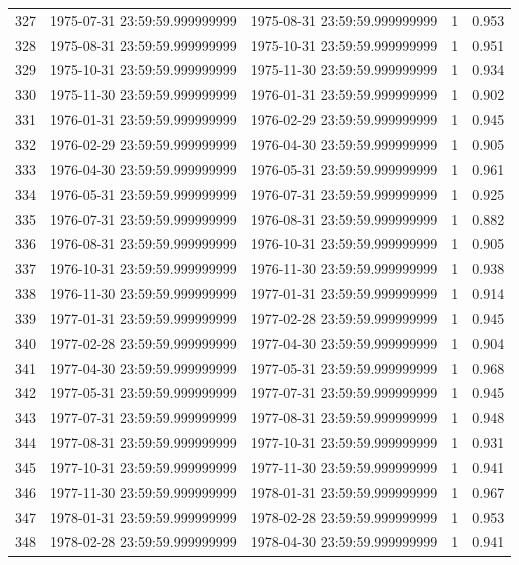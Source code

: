 \begin{table}
\begin{tabular}{lcccc}
327 & 1975-07-31 23:59:59.999999999 & 1975-08-31 23:59:59.999999999 & 1 & 0.953 \\
328 & 1975-08-31 23:59:59.999999999 & 1975-10-31 23:59:59.999999999 & 1 & 0.951 \\
329 & 1975-10-31 23:59:59.999999999 & 1975-11-30 23:59:59.999999999 & 1 & 0.934 \\
330 & 1975-11-30 23:59:59.999999999 & 1976-01-31 23:59:59.999999999 & 1 & 0.902 \\
331 & 1976-01-31 23:59:59.999999999 & 1976-02-29 23:59:59.999999999 & 1 & 0.945 \\
332 & 1976-02-29 23:59:59.999999999 & 1976-04-30 23:59:59.999999999 & 1 & 0.905 \\
333 & 1976-04-30 23:59:59.999999999 & 1976-05-31 23:59:59.999999999 & 1 & 0.961 \\
334 & 1976-05-31 23:59:59.999999999 & 1976-07-31 23:59:59.999999999 & 1 & 0.925 \\
335 & 1976-07-31 23:59:59.999999999 & 1976-08-31 23:59:59.999999999 & 1 & 0.882 \\
336 & 1976-08-31 23:59:59.999999999 & 1976-10-31 23:59:59.999999999 & 1 & 0.905 \\
337 & 1976-10-31 23:59:59.999999999 & 1976-11-30 23:59:59.999999999 & 1 & 0.938 \\
338 & 1976-11-30 23:59:59.999999999 & 1977-01-31 23:59:59.999999999 & 1 & 0.914 \\
339 & 1977-01-31 23:59:59.999999999 & 1977-02-28 23:59:59.999999999 & 1 & 0.945 \\
340 & 1977-02-28 23:59:59.999999999 & 1977-04-30 23:59:59.999999999 & 1 & 0.904 \\
341 & 1977-04-30 23:59:59.999999999 & 1977-05-31 23:59:59.999999999 & 1 & 0.968 \\
342 & 1977-05-31 23:59:59.999999999 & 1977-07-31 23:59:59.999999999 & 1 & 0.945 \\
343 & 1977-07-31 23:59:59.999999999 & 1977-08-31 23:59:59.999999999 & 1 & 0.948 \\
344 & 1977-08-31 23:59:59.999999999 & 1977-10-31 23:59:59.999999999 & 1 & 0.931 \\
345 & 1977-10-31 23:59:59.999999999 & 1977-11-30 23:59:59.999999999 & 1 & 0.941 \\
346 & 1977-11-30 23:59:59.999999999 & 1978-01-31 23:59:59.999999999 & 1 & 0.967 \\
347 & 1978-01-31 23:59:59.999999999 & 1978-02-28 23:59:59.999999999 & 1 & 0.953 \\
348 & 1978-02-28 23:59:59.999999999 & 1978-04-30 23:59:59.999999999 & 1 & 0.941 \\

\end{tabular}
\end{table}
